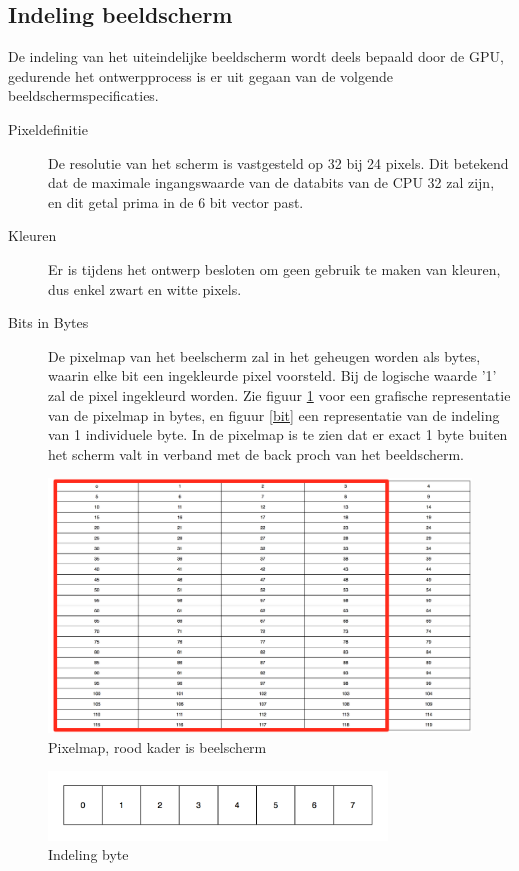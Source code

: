 \documentclass[oneside,dutch]{tudelft-report}
\begin{document}
\subsection{Indeling beeldscherm}
De indeling van het uiteindelijke beeldscherm wordt deels bepaald door de GPU, gedurende het ontwerpprocess is er uit gegaan van de volgende beeldschermspecificaties.
\begin{description}
\item[Pixeldefinitie]
	De resolutie van het scherm is vastgesteld op 32 bij 24 pixels. Dit betekend dat de maximale ingangswaarde van de databits van de CPU 32 zal zijn, en dit getal prima in de 6 bit vector past.

\item[Kleuren]
	Er is tijdens het ontwerp besloten om geen gebruik te maken van kleuren, dus enkel zwart en witte pixels.

\item[Bits in Bytes]
	De pixelmap van het beelscherm zal in het geheugen worden als bytes, waarin elke bit een ingekleurde pixel voorsteld. Bij de logische waarde '1' zal de pixel ingekleurd worden. Zie figuur \ref{pixelmap} voor een grafische representatie van de pixelmap in bytes, en figuur \ref{bit} een representatie van de indeling van 1 individuele byte. In de pixelmap is te zien dat er exact 1 byte buiten het scherm valt in verband met de back proch van het beeldscherm.
\end{description}

\begin{figure}[H]
\center
\includegraphics[width=15cm]{pixelmap}
\caption{Pixelmap, rood kader is beelscherm}
\label{pixelmap}
\end{figure}

\begin{figure}[H]
\center
\includegraphics[width=9cm]{byte}
\caption{Indeling byte}
\label{byte}
\end{figure}
\end{document}
